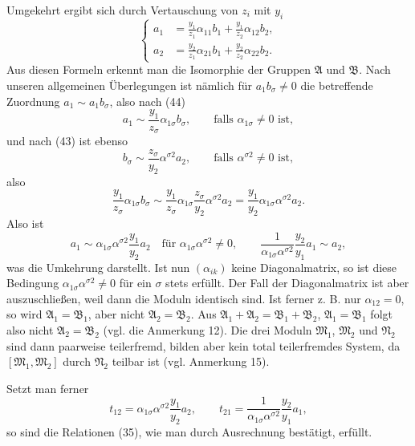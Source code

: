 \documentclass[11pt]{article}
\begin{document}
Umgekehrt ergibt sich durch Vertauschung von $z_i$ mit $y_i$
\begin{equation}
\left\{
\begin{aligned}
 a_1&=\frac{y_1}{z_1}\alpha_{11}b_1+\frac{y_1}{z_2}\alpha_{12}b_2,\\
 a_2&=\frac{y_2}{z_1}\alpha_{21}b_1+\frac{y_2}{z_2}\alpha_{22}b_2.
\end{aligned}\right.
\tag{44}
\end{equation}
Aus diesen Formeln erkennt man die Isomorphie der Gruppen $\mathfrak A$ und $\mathfrak B$. Nach unseren allgemeinen Überlegungen ist nämlich für $a_1b_\sigma\ne0$ die betreffende Zuordnung $a_1\sim a_1b_\sigma$, also nach (44)
\[
 a_1\sim\frac{y_1}{z_\sigma}\alpha_{1\sigma}b_\sigma,
 \qquad\text{falls }\alpha_{1\sigma}\ne0\text{ ist},
\]
und nach (43) ist ebenso
\[
 b_\sigma\sim\frac{z_\sigma}{y_2}\alpha^{\sigma2}a_2,
 \qquad\text{falls }\alpha^{\sigma2}\ne0\text{ ist},
\]
also
\[
 \frac{y_1}{z_\sigma}\alpha_{1\sigma}b_\sigma
 \sim
 \frac{y_1}{z_\sigma}\alpha_{1\sigma}\frac{z_\sigma}{y_2}\alpha^{\sigma2}a_2
 =\frac{y_1}{y_2}\alpha_{1\sigma}\alpha^{\sigma2}a_2.
\]
Also ist
\[
 a_1\sim\alpha_{1\sigma}\alpha^{\sigma2}\frac{y_1}{y_2}a_2
 \quad\text{für }\alpha_{1\sigma}\alpha^{\sigma2}\ne0,
 \qquad
 \frac{1}{\alpha_{1\sigma}\alpha^{\sigma2}}\frac{y_2}{y_1}a_1\sim a_2,
\]
was die Umkehrung darstellt. Ist nun $(\alpha_{ik})$ keine Diagonalmatrix, so ist diese Bedingung $\alpha_{1\sigma}\alpha^{\sigma2}\ne0$ für ein $\sigma$ stets erfüllt. Der Fall der Diagonalmatrix ist aber auszuschließen, weil dann die Moduln identisch sind. Ist ferner z. B. nur $\alpha_{12}=0$, so wird $\mathfrak A_1=\mathfrak B_1$, aber nicht $\mathfrak A_2=\mathfrak B_2$. Aus $\mathfrak A_1+\mathfrak A_2=\mathfrak B_1+\mathfrak B_2$, $\mathfrak A_1=\mathfrak B_1$ folgt also nicht $\mathfrak A_2=\mathfrak B_2$ (vgl. die Anmerkung 12). Die drei Moduln $\mathfrak M_1$, $\mathfrak M_2$ und $\mathfrak N_2$ sind dann paarweise teilerfremd, bilden aber kein total teilerfremdes System, da $[\mathfrak M_1,
\mathfrak M_2]$ durch $\mathfrak N_2$ teilbar ist (vgl. Anmerkung 15).

Setzt man ferner
\[
 t_{12}=\alpha_{1\sigma}\alpha^{\sigma2}\frac{y_1}{y_2}a_2,
 \qquad
 t_{21}=\frac{1}{\alpha_{1\sigma}\alpha^{\sigma2}}\frac{y_2}{y_1}a_1,
\]
so sind die Relationen (35), wie man durch Ausrechnung bestätigt, erfüllt.
\end{document}
